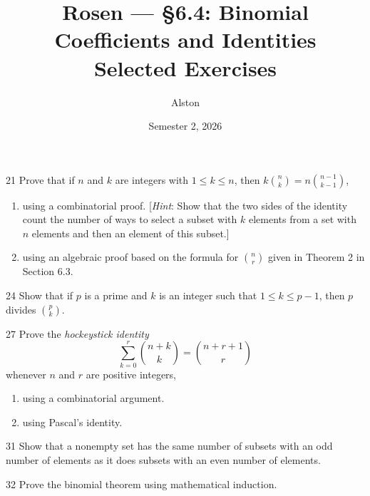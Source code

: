 \documentclass[11pt]{article}
\title{Rosen --- \S 6.4: Binomial Coefficients and Identities\\ \large Selected Exercises}
\author{Alston}
\date{Semester 2, 2026}
\begin{document}
\maketitle

\begin{exercise}{21}
    Prove that if $n$ and $k$ are integers with $1 \leq k \leq n$,
    then $k\binom{n}{k} = n\binom{n-1}{k-1}$,
    \begin{enumerate}[label=(\alph*)]
        \item using a combinatorial proof.
        [\emph{Hint}: Show that the two sides of the identity count
        the number of ways to select a subset with $k$ elements from
        a set with $n$ elements and then an element of this subset.]
        \item using an algebraic proof based on the formula for
        $\binom{n}{r}$ given in Theorem 2 in Section 6.3.
    \end{enumerate}
\end{exercise}

\begin{exercise}{24}
    Show that if $p$ is a prime and $k$ is an integer such that
    $1 \leq k \leq p-1$, then $p$ divides $\binom{p}{k}$.
\end{exercise}

\begin{exercise}{27}
    Prove the \emph{hockeystick identity}
    \[
    \sum_{k=0}^{r} \binom{n+k}{k} = \binom{n+r+1}{r}
    \]
    whenever $n$ and $r$ are positive integers,
    \begin{enumerate}[label=(\alph*)]
        \item using a combinatorial argument.
        \item using Pascal's identity.
    \end{enumerate}
\end{exercise}

\begin{exercise}{31}
    Show that a nonempty set has the same number of subsets with an
    odd number of elements as it does subsets with an even number of
    elements.
\end{exercise}

\begin{exercise}{32}
    Prove the binomial theorem using mathematical induction.
\end{exercise}
\end{document}
